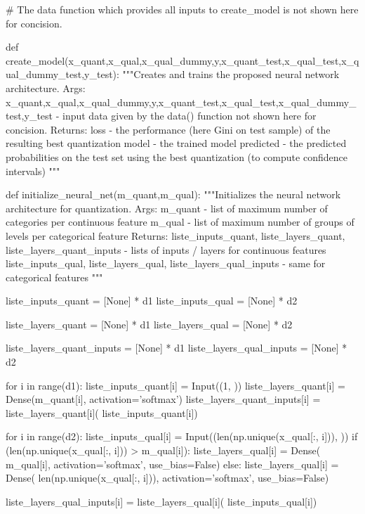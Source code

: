 \begin{pylisting}
# The data function which provides all inputs to create_model is not shown here for concision.

def create_model(x_quant,x_qual,x_qual_dummy,y,x_quant_test,x_qual_test,x_qual_dummy_test,y_test):
    """Creates and trains the proposed neural network architecture.
    Args:
       x_quant,x_qual,x_qual_dummy,y,x_quant_test,x_qual_test,x_qual_dummy_test,y_test - input data given by the data() function not shown here for concision.
    Returns:
       loss - the performance (here Gini on test sample) of the resulting best quantization
       model - the trained model
       predicted - the predicted probabilities on the test set using the best quantization (to compute confidence intervals)
    """
    
    def initialize_neural_net(m_quant,m_qual):
        """Initializes the neural network architecture for quantization.
	    Args:
	       m_quant - list of maximum number of categories per continuous feature
	       m_qual - list of maximum number of groups of levels per categorical feature
	    Returns:
            liste_inputs_quant, liste_layers_quant, liste_layers_quant_inputs - lists of inputs / layers for continuous features
            liste_inputs_qual, liste_layers_qual, liste_layers_qual_inputs - same for categorical features
	    """
	    
        liste_inputs_quant = [None] * d1
        liste_inputs_qual = [None] * d2

        liste_layers_quant = [None] * d1
        liste_layers_qual = [None] * d2

        liste_layers_quant_inputs = [None] * d1
        liste_layers_qual_inputs = [None] * d2

        for i in range(d1):
            liste_inputs_quant[i] = Input((1, ))
            liste_layers_quant[i] = Dense(m_quant[i], activation='softmax')
            liste_layers_quant_inputs[i] = liste_layers_quant[i](
                liste_inputs_quant[i])

        for i in range(d2):
            liste_inputs_qual[i] = Input((len(np.unique(x_qual[:, i])), ))
            if (len(np.unique(x_qual[:, i])) > m_qual[i]):
                liste_layers_qual[i] = Dense(
                m_qual[i], activation='softmax', use_bias=False)
            else:
                liste_layers_qual[i] = Dense(
                len(np.unique(x_qual[:, i])), activation='softmax', use_bias=False)

            liste_layers_qual_inputs[i] = liste_layers_qual[i](
                liste_inputs_qual[i])


\end{pylisting}
